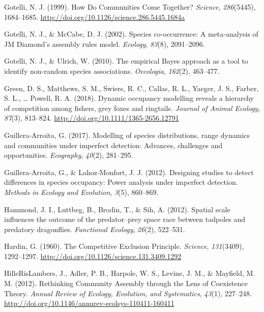 \documentclass[12pt,twoside]{reedthesis}
\begin{document}
\leavevmode\hypertarget{ref-gotelli_how_1999}{}%
Gotelli, N. J. (1999). How Do Communities Come Together? \emph{Science}, \emph{286}(5445), 1684--1685. \url{http://doi.org/10.1126/science.286.5445.1684a}

\leavevmode\hypertarget{ref-gotelli_species_2002}{}%
Gotelli, N. J., \& McCabe, D. J. (2002). Species co‐occurrence: A meta‐analysis of JM Diamond's assembly rules model. \emph{Ecology}, \emph{83}(8), 2091--2096.

\leavevmode\hypertarget{ref-gotelli_empirical_2010}{}%
Gotelli, N. J., \& Ulrich, W. (2010). The empirical Bayes approach as a tool to identify non-random species associations. \emph{Oecologia}, \emph{162}(2), 463--477.

\leavevmode\hypertarget{ref-green_dynamic_2018}{}%
Green, D. S., Matthews, S. M., Swiers, R. C., Callas, R. L., Yaeger, J. S., Farber, S. L., \ldots{} Powell, R. A. (2018). Dynamic occupancy modelling reveals a hierarchy of competition among fishers, grey foxes and ringtails. \emph{Journal of Animal Ecology}, \emph{87}(3), 813--824. \url{http://doi.org/10.1111/1365-2656.12791}

\leavevmode\hypertarget{ref-guilleraarroita_modelling_2017}{}%
Guillera‐Arroita, G. (2017). Modelling of species distributions, range dynamics and communities under imperfect detection: Advances, challenges and opportunities. \emph{Ecography}, \emph{40}(2), 281--295.

\leavevmode\hypertarget{ref-guilleraarroita_designing_2012}{}%
Guillera‐Arroita, G., \& Lahoz‐Monfort, J. J. (2012). Designing studies to detect differences in species occupancy: Power analysis under imperfect detection. \emph{Methods in Ecology and Evolution}, \emph{3}(5), 860--869.

\leavevmode\hypertarget{ref-hammond_spatial_2012}{}%
Hammond, J. I., Luttbeg, B., Brodin, T., \& Sih, A. (2012). Spatial scale influences the outcome of the predator--prey space race between tadpoles and predatory dragonflies. \emph{Functional Ecology}, \emph{26}(2), 522--531.

\leavevmode\hypertarget{ref-hardin_competitive_1960}{}%
Hardin, G. (1960). The Competitive Exclusion Principle. \emph{Science}, \emph{131}(3409), 1292--1297. \url{http://doi.org/10.1126/science.131.3409.1292}

\leavevmode\hypertarget{ref-hillerislambers_rethinking_2012}{}%
HilleRisLambers, J., Adler, P. B., Harpole, W. S., Levine, J. M., \& Mayfield, M. M. (2012). Rethinking Community Assembly through the Lens of Coexistence Theory. \emph{Annual Review of Ecology, Evolution, and Systematics}, \emph{43}(1), 227--248. \url{http://doi.org/10.1146/annurev-ecolsys-110411-160411}
\end{document}
